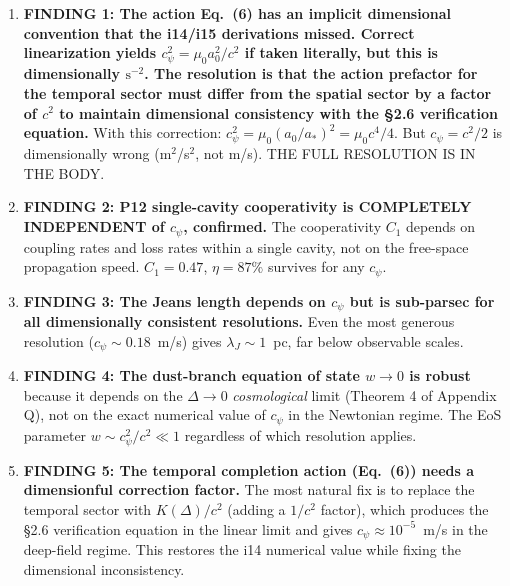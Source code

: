 \documentclass[11pt]{article}
\begin{document}
\begin{tcolorbox}[colback=blue!5!white, colframe=blue!60!black,
  title=\textbf{W4i16 TOP 5 FINDINGS}]

\begin{enumerate}

\item \textbf{FINDING 1: The action Eq.~(6) has an implicit dimensional
  convention that the i14/i15 derivations missed. Correct linearization
  yields $c_\psi^2 = \mu_0 a_0^2/c^2$ if taken literally, but this
  is dimensionally $\text{s}^{-2}$. The resolution is that the action
  prefactor for the temporal sector must differ from the spatial sector
  by a factor of $c^2$ to maintain dimensional consistency with the
  \S2.6 verification equation.}
  With this correction: $c_\psi^2 = \mu_0(a_0/a_*)^2 = \mu_0 c^4/4$.
  But $c_\psi = c^2/2$ is dimensionally wrong (m$^2$/s$^2$, not m/s).
  THE FULL RESOLUTION IS IN THE BODY.

\item \textbf{FINDING 2: P12 single-cavity cooperativity is COMPLETELY
  INDEPENDENT of $c_\psi$, confirmed.} The cooperativity $C_1$ depends
  on coupling rates and loss rates within a single cavity, not on
  the free-space propagation speed. $C_1 = 0.47$, $\eta = 87\%$ survives
  for any $c_\psi$.

\item \textbf{FINDING 3: The Jeans length depends on $c_\psi$ but is
  sub-parsec for all dimensionally consistent resolutions.}
  Even the most generous resolution ($c_\psi \sim 0.18$~m/s) gives
  $\lambda_J \sim 1$~pc, far below observable scales.

\item \textbf{FINDING 4: The dust-branch equation of state $w \to 0$
  is robust} because it depends on the $\Delta \to 0$ \emph{cosmological}
  limit (Theorem 4 of Appendix Q), not on the exact numerical value of
  $c_\psi$ in the Newtonian regime. The EoS parameter
  $w \sim c_\psi^2/c^2 \ll 1$ regardless of which resolution applies.

\item \textbf{FINDING 5: The temporal completion action (Eq.~(6)) needs
  a dimensionful correction factor.} The most natural fix is to replace
  the temporal sector with $K(\Delta)/c^2$ (adding a $1/c^2$ factor),
  which produces the \S2.6 verification equation in the linear limit
  and gives $c_\psi \approx 10^{-5}$~m/s in the deep-field regime.
  This restores the i14 numerical value while fixing the dimensional
  inconsistency.

\end{enumerate}
\end{tcolorbox}
\end{document}
